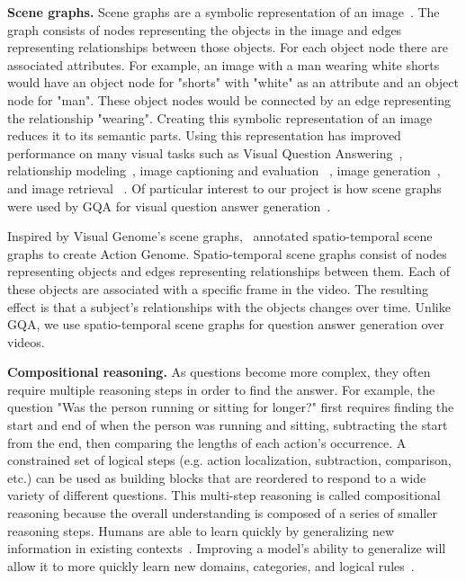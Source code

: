 \noindent\textbf{Scene graphs.}
Scene graphs are a symbolic representation of an image~\cite{krishna2017visual}. The graph consists of nodes representing the objects in the image and edges representing relationships between those objects. For each object node there are associated attributes. For example, an image with a man wearing white shorts would have an object node for "shorts" with "white" as an attribute and an object node for "man". These object nodes would be connected by an edge representing the relationship "wearing". Creating this symbolic representation of an image reduces it to its semantic parts. Using this representation has improved performance on many visual tasks such as Visual Question Answering~\cite{johnson2017inferring}, relationship modeling~\cite{krishna2018referring}, image captioning and evaluation ~\cite{anderson2016spice}, image generation~\cite{johnson2018image,ashual2019specifying}, and image retrieval ~\cite{ashual2019specifying,johnson2015image}. Of particular interest to our project is how scene graphs were used by GQA for visual question answer generation~\cite{hudson2019gqa}.

Inspired by Visual Genome's scene graphs,~\cite{ji2020action} annotated spatio-temporal scene graphs to create Action Genome. Spatio-temporal scene graphs consist of nodes representing objects and edges representing relationships between them. Each of these objects are associated with a specific frame in the video. The resulting effect is that a subject's relationships with the objects changes over time. Unlike GQA, we use spatio-temporal scene graphs for question answer generation over videos. 

\noindent\textbf{Compositional reasoning.}
As questions become more complex, they often require multiple reasoning steps in order to find the answer. For example, the question "Was the person running or sitting for longer?" first requires finding the start and end of when the person was running and sitting, subtracting the start from the end, then comparing the lengths of each action's occurrence. A constrained set of logical steps (e.g. action localization, subtraction, comparison, etc.) can be used as building blocks that are reordered to respond to a wide variety of different questions. This multi-step reasoning is called compositional reasoning because the overall understanding is composed of a series of smaller reasoning steps. Humans are able to learn quickly by generalizing new information in existing contexts~\cite{tani2014self,schulz2016probing}. Improving a model's ability to generalize will allow it to more quickly learn new domains, categories, and logical rules~\cite{lake2018generalization,vatashsky2020vqa}. 

